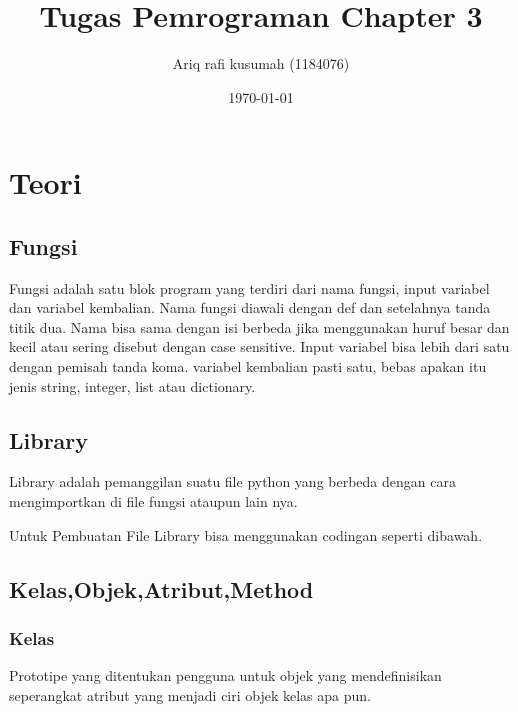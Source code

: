 \documentclass[12pt, times new roman]{report}
\title{Tugas Pemrograman Chapter 3}
\author{Ariq rafi kusumah (1184076)}
\date{\today}
\begin{document}
\maketitle

\chapter{Teori}

\section{Fungsi}

\hspace{1cm}Fungsi adalah satu blok program yang terdiri dari nama fungsi, input variabel dan variabel kembalian. Nama fungsi diawali dengan def dan setelahnya tanda titik dua. Nama bisa sama dengan isi berbeda jika menggunakan huruf besar dan kecil atau sering disebut dengan case sensitive. Input variabel bisa lebih dari satu dengan pemisah tanda koma. variabel kembalian pasti satu, bebas apakan itu jenis string, integer, list atau dictionary.



\section{Library}

\hspace{1cm}Library adalah pemanggilan suatu file python yang berbeda dengan cara mengimportkan di file fungsi ataupun lain nya.



\hspace{1cm}Untuk Pembuatan File Library bisa menggunakan codingan seperti dibawah.



\section{Kelas,Objek,Atribut,Method}


    \subsection{Kelas}
    \hspace{1cm}Prototipe yang ditentukan pengguna untuk objek yang mendefinisikan seperangkat atribut yang menjadi ciri objek kelas apa pun.
    
\end{document}
